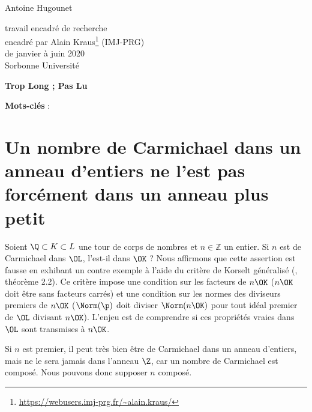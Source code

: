 \documentclass[a4paper, 12pt, oneside]{article}
\begin{document}
\begin{titlepage}
\begin{center}
	\large Antoine Hugounet \\

	\vspace{40px}
	\LARGE {}

	\vspace{40px}
	\large
	travail encadré de recherche \\
	encadré par Alain Kraus\footnote{\url{https://webusers.imj-prg.fr/~alain.kraus/}} (IMJ-PRG) \\
	de janvier à juin 2020 \\

	\vspace{20px}
	Sorbonne Université
\end{center}

\normalsize
\vspace{80px}
\begin{center} \textbf{Trop Long ; Pas Lu} \end{center}
\vspace{-1em}

\vfill
\begin{center}
	\normalsize \textbf{Mots-clés} : \textit{}
\end{center}
\end{titlepage}

\section{Un nombre de Carmichael dans un anneau d'entiers ne l'est pas forcément dans un anneau plus petit }

Soient $\Q \subset K \subset L$ une tour de corps de nombres et $n\in \mathbb{Z}$ un entier. Si $n$ est de Carmichael dans $\OL$, l'est-il dans $\OK$ ? Nous affirmons que cette assertion est fausse en exhibant un contre exemple à l'aide du critère de Korselt généralisé (\cite{article}, théorème 2.2). Ce critère impose une condition sur les facteurs de $n\OK$ ($n\OK$ doit être sans facteurs carrés) et une condition sur les normes des diviseurs premiers de $n\OK$ ($\Norm(\p)$ doit diviser $\Norm(n\OK)$ pour tout idéal premier de $\OL$ divisant $n\OK$). L'enjeu est de comprendre si ces propriétés vraies dans $\OL$ sont transmises à $n\OK$.

\begin{remarque}Si $n$ est premier, il peut très bien être de Carmichael dans un anneau d'entiers, mais ne le sera jamais dans l'anneau $\Z$, car un nombre de Carmichael est composé. Nous pouvons donc supposer $n$ composé. \end{remarque}
\end{document}
